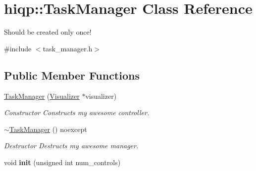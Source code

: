 \hypertarget{classhiqp_1_1TaskManager}{\section{hiqp\-:\-:Task\-Manager Class Reference}
\label{classhiqp_1_1TaskManager}
}


Should be created only once!  




{\ttfamily \#include $<$task\-\_\-manager.\-h$>$}

\subsection*{Public Member Functions}
\begin{DoxyCompactItemize}
\item 
\hypertarget{classhiqp_1_1TaskManager_a79ce349f194b18d0fb6177dde0903b2b}{\hyperlink{classhiqp_1_1TaskManager_a79ce349f194b18d0fb6177dde0903b2b}{Task\-Manager} (\hyperlink{classhiqp_1_1Visualizer}{Visualizer} $\ast$visualizer)}\label{classhiqp_1_1TaskManager_a79ce349f194b18d0fb6177dde0903b2b}

\begin{DoxyCompactList}\small\item\em Constructor Constructs my awesome controller. \end{DoxyCompactList}\item 
\hyperlink{classhiqp_1_1TaskManager_a688ad548e2ef681b458c1fc90326f6e6}{$\sim$\-Task\-Manager} () noexcept
\begin{DoxyCompactList}\small\item\em Destructor Destructs my awesome manager. \end{DoxyCompactList}\item 
\hypertarget{classhiqp_1_1TaskManager_a640c2adc882769f691557a7ffd9c6cab}{void {\bfseries init} (unsigned int num\-\_\-controls)}\label{classhiqp_1_1TaskManager_a640c2adc882769f691557a7ffd9c6cab}


\end{DoxyCompactItemize}

